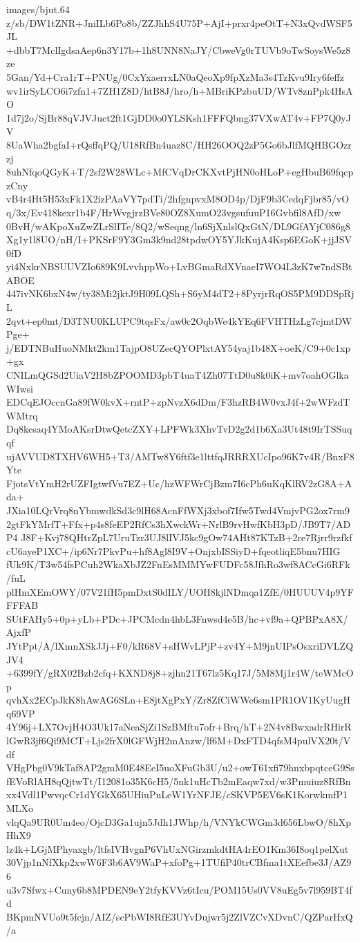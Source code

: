 \begin{filecontents*}{images/bjut.64}
z/sb/DW1tZNR+JniILb6Po8b/ZZJhhS4U75P+AjI+prxr4peOtT+N3xQvdWSF5JL
+dbbT7MclIgdsaAep6n3Y17b+1h8UNN8NaJY/CbweVg0rTUVb9oTwSoysWe5z8ze
5Gan/Yd+Cra1rT+PNUg/0CxYxaerrxLN0aQeoXp9fpXzMa3s4TzKvu9Iry6feffz
wv1irSyLCO6i7zfn1+7ZH1Z8D/htB8J/hro/h+MBriKPzbuUD/WTv8znPpk4HsAO
1d7j2o/SjBr88qVJVJuct2ft1GjDD0o0YLSKsh1FFFQbng37VXwAT4v+FP7Q0yJV
8UaWha2bgfaI+rQsffqPQ/U18RfBn4uaz8C/HH26OOQ2zP5Go6bJlfMQHBGOzrzj
8uhNfqoQGyK+T/2sf2W28WLc+MfCVqDrCKXvtPjHN0oHLoP+egHbuB69fqcpzCny
vB4r4Ht5H53xFk1X2izPAaVY7pdTi/2hfgnpvxM8OD4p/DjF9b3CedqFjbr85/vO
q/3x/Ev418kexr1b4F/HrWvgjrzBVe80OZ8XumO23vgsufuuP16Gvbfil8AfD/xw
0BvH/wAKpoXuZwZLrSlITe/8Q2/wSeqng/ln6SjXnlslQxGtN/DL9GfAYjC086g8
Xg1y1l8UO/nH/I+PKSrF9Y3Gm3k9nd28tpdwOY5YJkKujA4Ksp6EGoK+jjJSV0fD
yi4NxkrNBSUUVZIo689K9LvvhppWo+LvBGmaRdXVnaeI7WO4L3zK7w7ndSBtABOE
447ivNK6bxN4w/ty38Mi2jktJ9H09LQSh+S6yM4dT2+8PyrjrRqOS5PM9DDSpRjL
2qvt+ep0mt/D3TNU0KLUPC9tqsFx/aw0c2OqbWe4kYEq6FVHTHzLg7cjmtDWPge+
j/EDTNBuHuoNMkt2km1TajpO8UZecQYOPlxtAY54yaj1b48X+oeK/C9+0c1xp+gx
CNILmQGSd2UiaV2H8bZPOOMD3pbT4uaT4Zh07TtD0u8k0iK+mv7oahOGlkaWIwsi
EDCqEJOccnGa89fW0kvX+rntP+zpNvzX6dDm/F3hzRB4W0vxJ4f+2wWFzdTWMtrq
Dq8kcsaq4YMoAKsrDtwQetcZXY+LPFWk3XhvTvD2g2d1b6Xa3Ut48t9IrTSSuqqf
ujAVVUD8TXHV6WH5+T3/AMTw8Y6ftf3e1lttfqJRRRXUcIpo96K7v4R/BnxF8Yte
FjotsVtYmH2rUZFIgtwfVu7EZ+Uc/hzWFWrCjBzm7I6cPh6uKqKlRV2zG8A+Ada+
JXia10LQrVrq8nYbmwdkSd3c9lH68AcnFfWXj3xbof7Ifw5Twd4VmjvPG2ox7rm9
2gtFkYMrfT+Ffx+p4s8feEP2RfCs3hXwckWr+NrlB9rvHwfKbH3pD/JB9T7/ADP4
J8F+Kvj78QHtrZpL7UruTzr3UJ8lIVJ5kc9gOw74AHt87KTzB+2re7Rjrr9rzfkf
cU6ayeP1XC+/ip6Nr7PkvPu+hf8Agl8I9V+OnjxbISSiyD+fqeotliqE5bnu7HIG
fUk9K/T3w54fsPCuh2WkaXbJZ2FnEsMMMYwFUDFc58JfhRo3wf8ACcGi6RFk/fuL
plHmXEmOWY/07V21fH5pmDxtS0dILY/UOH8kjlNDmqa1ZfE/0HUUUV4p9YFFFFAB
SUtFAHy5+0p+yLb+PDc+JPCMcdn4hbL3Fnwsd4e5B/hc+vf9a+QPBPxA8X/AjxfP
JYtPpt/A/lXmnXSkJJj+F0/kR68V+sHWvLPjP+zv4Y+M9jnUIPsOsxriDVLZQJV4
+6399fY/gRX02Bzb2cfq+KXND8j8+zjhn21T67lz5Kq17J/5M8Mj1r4W/teWMcOp
qvhXx2ECpJkK8hAwAG6SLn+E8jtXgPxY/Zr8ZfCiWWe6sm1PR1OV1KyUugHq69VP
4Y96j+LX7OvjH4O3Uk17aNeaSjZi1SzBMftu7ofr+Brq/hT+2N4v8BwxadrRHirR
lGwR3jf6Qi9MCT+Ljs2frX0lGFWjH2mAnzw/lf6M+DxFTD4qfsM4pulVX20t/Vdf
VHgPbg0V9kTaf8AP2gmM0E48EeI5uoXFuGb3U/u2+owT61xfi79hnxbpqtceG9Ss
fEVoRlAH8qQjtwTt/I12081o35K6cH5/5nk1uHcTb2mEaqw7xd/w3Pmuiuz8RfBn
xx4Vdl1PwvqcCr1dYGkX65UHiuPuLeW1YrNFJE/cSKVP5EV6sK1KorwkmfP1MLXo
vlqQa9UR0Um4eo/OjcD3Ga1ujn5Jdh1JWhp/h/VNYkCWGm3d656LbwO/8hXpHhX9
lz4k+LGjMPhyaxgb/ltfsIVHvgnP6VhUxNGirzmkdtHA4rEO1Km36I8oq1pelXut
30Vjp1nNfXkp2xwW6F3b6AV9WaP+xfoPg+1TUfiP40trCBfma1tXEefbe3J/AZ96
u3v7Sfwx+Cuny6b8MPDEN9eY2tfyKVVz6tIcu/POM15Us0VV8uEg5v7l959BT4fd
BKpmNVUo9t5fcjn/AIZ/scPbWI8RfE3UYvDujwr5j2ZlVZCvXDvnC/QZParHxQ/a

\end{filecontents*}
